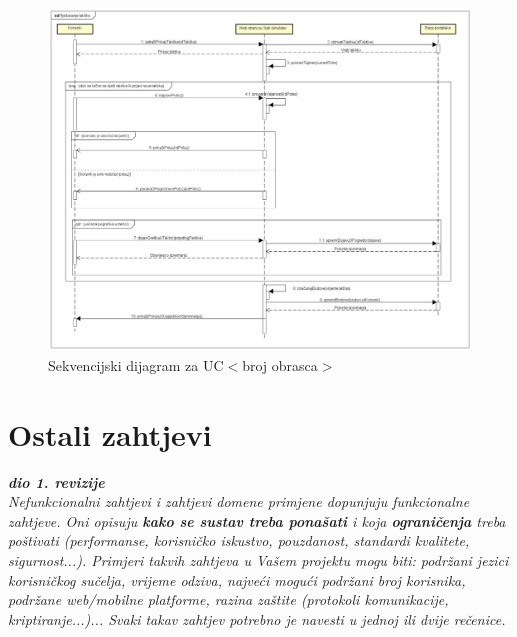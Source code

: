 				
				\begin{figure}[H]
					\centerfloat
					\includegraphics[scale=0.30]{dijagrami/RijesavanjeTaktike.jpg} %
					\caption{Sekvencijski dijagram za UC$<$broj obrasca$>$}
					\label{fig:UC$<$broj obrasca$>$}
				\end{figure}
				
				\eject

		\section{Ostali zahtjevi}
		
			\textbf{\textit{dio 1. revizije}}\\
			
			\textit{Nefunkcionalni zahtjevi i zahtjevi domene primjene dopunjuju funkcionalne zahtjeve. Oni opisuju \textbf{kako se sustav treba ponašati} i koja \textbf{ograničenja} treba poštivati (performanse, korisničko iskustvo, pouzdanost, standardi kvalitete, sigurnost...). Primjeri takvih zahtjeva u Vašem projektu mogu biti: podržani jezici korisničkog sučelja, vrijeme odziva, najveći mogući podržani broj korisnika, podržane web/mobilne platforme, razina zaštite (protokoli komunikacije, kriptiranje...)... Svaki takav zahtjev potrebno je navesti u jednoj ili dvije rečenice.}
			
